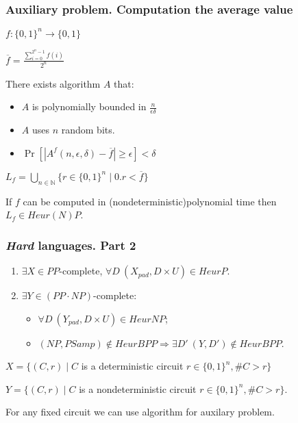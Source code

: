 \begin{frame}
    \frametitle{Auxiliary problem. Computation the average value}

    $f:\{0, 1\}^{n} \rightarrow \{0, 1\}$
    
    $\overline{f} = \frac{\sum\limits_{i = 0}^{2^n - 1}f(i)}{2^n}$

    \pause
    
    \begin{statement}[Goldreich]
        There exists algorithm $A$ that:
        \begin{itemize}
	        \item $A$ is polynomially bounded in $\frac{n}{\epsilon\delta}$
        	\item {\color{blue}$A$ uses $n$ random bits}.
        	\item $\Pr[|A^{f}(n, \epsilon, \delta) - \overline{f}| \ge \epsilon] <
		        \delta$
        \end{itemize}
    \end{statement}

    \pause
    $L_f = \bigcup\limits_{n \in \mathbb{N}}\{r \in \{0, 1\}^n \mid 0.r < \overline{f}\}$

    \begin{lemma}
        If $f$ can be computed in (nondeterministic)polynomial time then $L_f \in Heur(N)P$.
    \end{lemma}

\end{frame}


\begin{frame}
    \frametitle{\textit{Hard} languages. Part 2}
    \begin{theorem}
        \begin{enumerate}
            \item $\exists X \in PP$-complete, $\forall D~
	    		(X_{pad}, D \times U) \in HeurP$.
    		\pause
    		\item $\exists Y \in (PP \cdot NP)$-complete:
		        \begin{itemize}
        	        \item $\forall D~ (Y_{pad}, D \times U) \in HeurNP$;
                	\item $(NP, PSamp) \notin HeurBPP \Rightarrow \exists D'~ (Y, D')
                		\notin HeurBPP$.
		        \end{itemize}
        		
        \end{enumerate}
    \end{theorem}

    \pause
    $X = \{(C, r) \mid C$ is a deterministic circuit $r \in \{0, 1\}^n, \#C > r\}$
    
    $Y = \{(C, r) \mid C$ is a nondeterministic circuit $r \in \{0, 1\}^n, \#C >
    r\}$.

    \pause

    \vspace{0.2cm}
    For any fixed circuit we can use algorithm for auxilary problem.
\end{frame}



